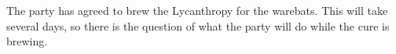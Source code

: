 The party has agreed to brew the Lycanthropy for the warebats.
This will take several days, so there is the question of what the party will do while the cure is brewing.
